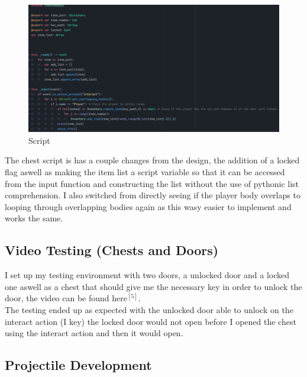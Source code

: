 \documentclass{article}
\begin{document}
        \begin{figure}[H]
                \centering
                \includegraphics[width = 0.9\columnwidth]{images/development/Chest_script.PNG}
                \caption{Script}
        \end{figure}
        \noindent The chest script is has a couple changes from the design, the addition of a locked flag aswell as making the item list a script variable so that it can be accessed from the input function and constructing the list without the use of pythonic list comprehension. I also switched from directly seeing if the player body overlaps to looping through overlapping bodies again as this wasy easier to implement and works the same.\\
        \subsection{Video Testing (Chests and Doors)}
        I set up my testing environment with two doors, a unlocked door and a locked one aswell as a chest that should give me the necessary key in order to unlock the door, the video can be found here$^{[5]}$.\\
        The testing ended up as expected with the unlocked door able to unlock on the interact action (I key) the locked door would not open before I opened the chest using the interact action and then it would open.\\
        \subsection{Projectile Development}
\end{document}
